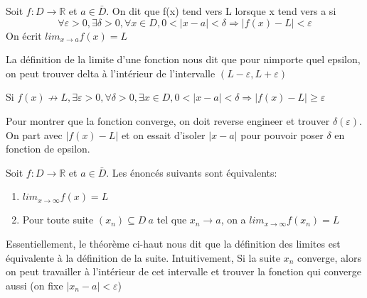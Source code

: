 \documentclass{article}
\begin{document}
\begin{definition}
\end{definition}

\begin{definition}
    Soit $f:D \rightarrow \mathbb{R}$ et $a \in \bar{D}$. On dit que
    f(x) tend vers L lorsque x tend vers a si
    $$ \forall \varepsilon > 0 , \exists \delta > 0, \forall x \in D,
    0 < |x-a|< \delta \Longrightarrow |f(x) -L| < \varepsilon$$
    On écrit $lim_{x \to a} f(x) = L$
\end{definition}

\begin{remark}
    La définition de la limite d'une fonction nous dit que pour nimporte
    quel epsilon, on peut trouver delta à l'intérieur de l'intervalle
    $(L-\varepsilon, L+\varepsilon)$
\end{remark}

\begin{remark}
    Si $f(x) \not\to L, \exists \varepsilon > 0, \forall \delta > 0,
    \exists x \in D, 0 < |x-a|< \delta \Longrightarrow |f(x)-L| \geq
    \varepsilon$
\end{remark}

\begin{problem}
    Pour montrer que la fonction converge, on doit reverse engineer et
    trouver $\delta (\varepsilon)$. On part avec $|f(x)-L|$ et on essait
    d'isoler $|x-a|$ pour pouvoir poser $\delta$ en fonction de epsilon.
\end{problem}

\begin{problem}
\end{problem}

\begin{theorem}
    Soit $f:D \rightarrow \mathbb{R}$ et $a \in \bar{D}$. Les énoncés
    suivants sont équivalents:
    \begin{enumerate}
	\item $lim_{x \to \infty} f(x)=L$
	\item Pour toute suite $(x_n) \subseteq D \ {a}$ tel que
	    $x_n \to a$, on a $lim_{x \to \infty} f(x_n)=L$
    \end{enumerate}
\end{theorem}

\begin{intuition}
    Essentiellement, le théorème ci-haut nous dit que la définition des
    limites est équivalente à la définition de la suite. Intuitivement,
    Si la suite $x_n$ converge, alors on peut travailler à l'intérieur
    de cet intervalle et trouver la fonction qui converge aussi (on
    fixe $|x_n -a|<\varepsilon$)
\end{intuition}
\end{document}
